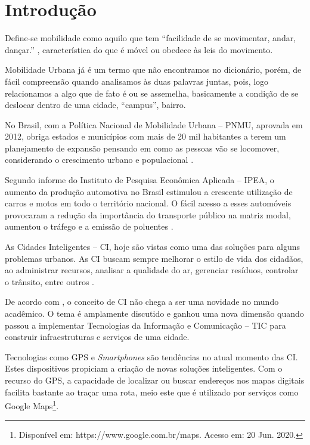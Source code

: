 %
%

\chapter{Introdução}\label{chap:introducao}  

Define-se mobilidade como aquilo que tem “facilidade de se movimentar, andar, dançar.” \cite{mobilidade}, característica do que é móvel ou obedece às leis do movimento. 

Mobilidade Urbana já é um termo que não encontramos no dicionário, porém, de fácil compreensão quando analisamos às duas palavras juntas, pois, logo relacionamos a algo que de fato é ou se assemelha, basicamente a condição
de se deslocar dentro de uma cidade, “campus”, bairro. %



No Brasil, com a Política Nacional de Mobilidade Urbana -- PNMU, aprovada em 2012, obriga estados e municípios com mais de 20 mil habitantes a terem um planejamento de expansão pensando em como as pessoas vão se locomover, considerando o crescimento urbano e populacional  \cite{lei12587}.

Segundo informe do Instituto de Pesquisa Econômica Aplicada -- IPEA, o aumento da produção automotiva no Brasil estimulou a crescente utilização de carros e motos em todo o território nacional. O fácil acesso a esses automóveis provocaram a redução da importância do transporte público na matriz modal, aumentou o tráfego e a emissão de poluentes \cite{ipea}.
 
As Cidades Inteligentes -- CI, hoje são vistas como uma das soluções para alguns problemas urbanos. As CI buscam sempre melhorar o estilo de vida dos cidadãos, ao administrar recursos, analisar a qualidade do ar, gerenciar resíduos, controlar o trânsito, entre outros \cite{chourabi}.

De acordo com , o conceito de CI não chega a ser uma novidade no mundo acadêmico. O tema é amplamente discutido e ganhou uma nova dimensão quando passou a implementar Tecnologias da Informação e Comunicação -- TIC para construir infraestruturas e serviços de uma cidade.	

Tecnologias como GPS e \textit{Smartphones} são tendências no atual momento das CI. Estes dispositivos propiciam a criação de novas soluções inteligentes. Com o recurso do GPS, a capacidade de localizar ou buscar endereços nos mapas digitais facilita bastante ao traçar uma rota, meio este que é utilizado por serviços como Google Maps\footnote{Disponível em: https://www.google.com.br/maps. Acesso em: 20 Jun. 2020.}.

